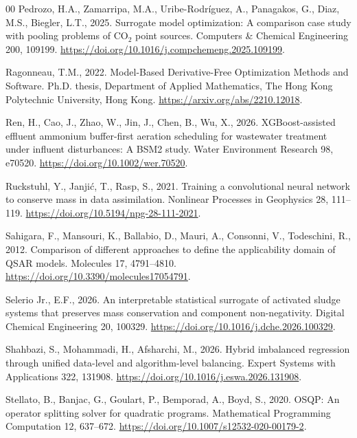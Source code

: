 \documentclass[a4paper,fleqn]{cas-sc}
\begin{document}
\begin{thebibliography}{00}
Pedrozo, H.A., Zamarripa, M.A., Uribe-Rodr\'iguez, A., Panagakos, G., Diaz, M.S., Biegler, L.T., 2025. Surrogate model optimization: A comparison case study with pooling problems of CO$_2$ point sources. Computers \& Chemical Engineering 200, 109199. \url{https://doi.org/10.1016/j.compchemeng.2025.109199}.

Ragonneau, T.M., 2022. Model-Based Derivative-Free Optimization Methods and Software. Ph.D. thesis, Department of Applied Mathematics, The Hong Kong Polytechnic University, Hong Kong. \url{https://arxiv.org/abs/2210.12018}.

Ren, H., Cao, J., Zhao, W., Jin, J., Chen, B., Wu, X., 2026. XGBoost-assisted effluent ammonium buffer-first aeration scheduling for wastewater treatment under influent disturbances: A BSM2 study. Water Environment Research 98, e70520. \url{https://doi.org/10.1002/wer.70520}.

Ruckstuhl, Y., Janji\'c, T., Rasp, S., 2021. Training a convolutional neural network to conserve mass in data assimilation. Nonlinear Processes in Geophysics 28, 111--119. \url{https://doi.org/10.5194/npg-28-111-2021}.

Sahigara, F., Mansouri, K., Ballabio, D., Mauri, A., Consonni, V., Todeschini, R., 2012. Comparison of different approaches to define the applicability domain of QSAR models. Molecules 17, 4791--4810. \url{https://doi.org/10.3390/molecules17054791}.

Selerio Jr., E.F., 2026. An interpretable statistical surrogate of activated sludge systems that preserves mass conservation and component non-negativity. Digital Chemical Engineering 20, 100329. \url{https://doi.org/10.1016/j.dche.2026.100329}.

Shahbazi, S., Mohammadi, H., Afsharchi, M., 2026. Hybrid imbalanced regression through unified data-level and algorithm-level balancing. Expert Systems with Applications 322, 131908. \url{https://doi.org/10.1016/j.eswa.2026.131908}.

Stellato, B., Banjac, G., Goulart, P., Bemporad, A., Boyd, S., 2020. OSQP: An operator splitting solver for quadratic programs. Mathematical Programming Computation 12, 637--672. \url{https://doi.org/10.1007/s12532-020-00179-2}.


\end{thebibliography}
\end{document}
